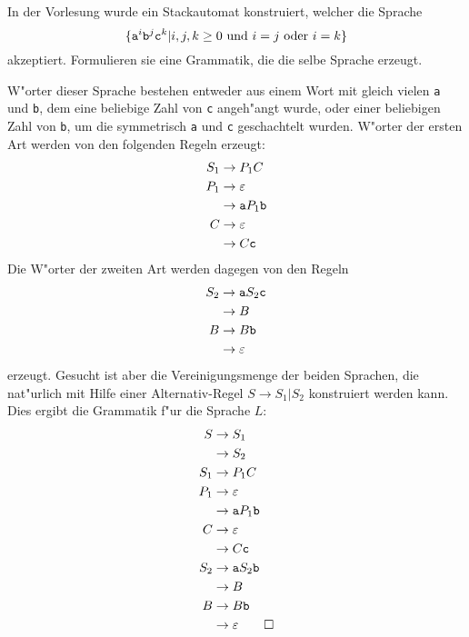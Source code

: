 In der Vorlesung wurde ein Stackautomat konstruiert, welcher die
Sprache
\[
\{{\tt a}^i{\tt b}^j{\tt c}^k|\text{$i,j,k\ge 0$ und $i=j$ oder $i=k$}\}
\]
akzeptiert.
Formulieren sie eine Grammatik, die die selbe Sprache erzeugt.

\begin{loesung}
W"orter dieser Sprache bestehen entweder aus einem Wort mit gleich
vielen {\tt a} und {\tt b}, dem eine beliebige Zahl von {\tt c}
angeh"angt wurde, oder einer beliebigen Zahl von {\tt b}, um die
symmetrisch {\tt a} und {\tt c} geschachtelt wurden.
W"orter der ersten Art werden von den folgenden Regeln erzeugt:
\begin{align*}
S_1&\to P_1C\\
P_1&\to\varepsilon\\
   &\to {\tt a}P_1{\tt b}\\
C  &\to\varepsilon\\
   &\to C{\tt c}
\end{align*}
Die W"orter der zweiten Art werden dagegen von den Regeln
\begin{align*}
S_2&\to{\tt a}S_2{\tt c}\\
   &\to B\\
B  &\to B{\tt b}\\
   &\to\varepsilon
\end{align*}
erzeugt.
Gesucht ist aber die Vereinigungsmenge der beiden Sprachen, die
nat"urlich mit Hilfe einer Alternativ-Regel $S\to S_1|S_2$
konstruiert werden kann.
Dies ergibt die Grammatik f"ur die Sprache $L$:
\begin{align*}
S  &\to S_1\\
   &\to S_2\\
S_1&\to P_1C\\
P_1&\to\varepsilon\\
   &\to {\tt a}P_1{\tt b}\\
C  &\to\varepsilon\\
   &\to C{\tt c}\\
S_2&\to{\tt a}S_2{\tt b}\\
   &\to B\\
B  &\to B{\tt b}\\
   &\to\varepsilon
\qedhere
\end{align*}
\end{loesung}
